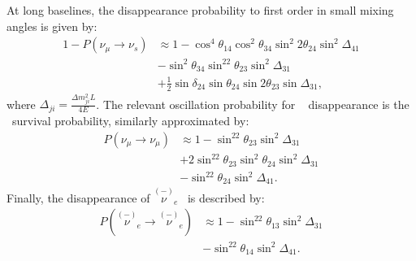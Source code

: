 At long baselines, the  disappearance probability to first order in small mixing angles is given by:
\begin{equation}\label{eq:numu_nus}
\begin{aligned}
1 - P(\nu_{\mu} \rightarrow \nu_s) & \approx 1 - \cos^4\theta_{14}\cos^2\theta_{34}\sin^{2}2\theta_{24}\sin^2\Delta_{41} \\
& - \sin^2\theta_{34}\sin^22\theta_{23}\sin^2\Delta_{31} \\
& + \frac{1}{2}\sin\delta_{24}\sin\theta_{24}\sin2\theta_{23}\sin\Delta_{31},
\end{aligned}
\end{equation}
where $\Delta_{ji} = \frac{\Delta m^2_{ji}L}{4E}$. 
The relevant oscillation probability for \numu~ disappearance is the \numu~survival probability, similarly approximated by:
\begin{equation}
\begin{aligned}
P(\nu_{\mu} \rightarrow \nu_{\mu}) &\approx 1 - \sin^22\theta_{23}\sin^2\Delta_{31} \\
& + 2\sin^22\theta_{23}\sin^2\theta_{24}\sin^2\Delta_{31} \\ 
& - \sin^22\theta_{24}\sin^2\Delta_{41}.
\label{eq:NuMuDisFull}
\end{aligned}
\end{equation}
Finally, the disappearance of $\overset{(-)}\nu\!\!_e$~ is described by: 
\begin{equation}
\begin{aligned}
P(\overset{(-)}\nu\!\!_e \rightarrow \overset{(-)}\nu\!\!_e) &\approx 1 - \sin^22\theta_{13}\sin^2\Delta_{31} \\
& - \sin^22\theta_{14}\sin^2\Delta_{41}.
\label{eq:NueDisFull}
\end{aligned}
\end{equation}

